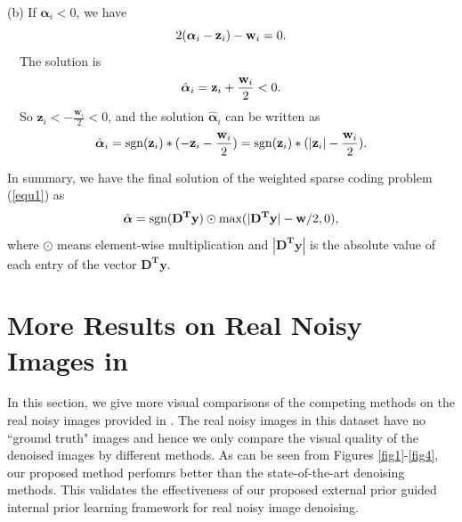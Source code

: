 \documentclass[10pt,onecolumn,letterpaper]{article}
\begin{document}
(b) If $\boldsymbol{\alpha}_{i}< 0$, we have
\begin{equation}\label{equ8}
\setlength{\abovedisplayskip}{0.1pt}
\setlength{\belowdisplayskip}{0.1pt}
2(\boldsymbol{\alpha}_{i}-\mathbf{z}_{i})-\mathbf{w}_{i}=0.
\end{equation}
\qquad\ \  The solution is
\begin{equation}\label{equ9}
\setlength{\abovedisplayskip}{0.1pt}
\setlength{\belowdisplayskip}{0.1pt}
\hat{\boldsymbol{\alpha}}_{i}=\mathbf{z}_{i}+\frac{\mathbf{w}_{i}}{2} < 0.
\end{equation}
\qquad\ \  So $\mathbf{z}_{i}<-\frac{\mathbf{w}_{i}}{2}< 0$, and the solution $\hat{\boldsymbol{\alpha}}_{i}$ can be written as
\begin{equation}\label{equ10}
\setlength{\abovedisplayskip}{1pt}
\setlength{\belowdisplayskip}{1pt}
\hat{\boldsymbol{\alpha}}_{i}=\text{sgn}(\mathbf{z}_{i})*(-\mathbf{z}_{i}-\frac{\mathbf{w}_{i}}{2})=\text{sgn}(\mathbf{z}_{i})*(|\mathbf{z}_{i}|-\frac{\mathbf{w}_{i}}{2}).
\end{equation} 

In summary, we have the final solution of the weighted sparse coding problem (\ref{equ1}) as
\begin{equation}\label{equ11}
\setlength{\abovedisplayskip}{3pt}
\setlength{\belowdisplayskip}{3pt}
\hat{\boldsymbol{\alpha}}= \text{sgn}(\mathbf{D^{T}y})\odot \text{max}(|\mathbf{D^{T}y}|-\mathbf{w}/2,0),
\end{equation}
where $\odot$ means element-wise multiplication and $|\mathbf{D^{T}y}|$ is the absolute value of each entry of the vector $\mathbf{D^{T}y}$.




\section{More Results on Real Noisy Images in \cite{ncwebsite}}
In this section, we give more visual comparisons of the competing methods on the real noisy images provided in \cite{ncwebsite}. The real noisy images in this dataset \cite{ncwebsite} have no ``ground truth" images and hence we only compare the visual quality of the denoised images by different methods. As can be seen from Figures \ref{fig1}-\ref{fig4}, our proposed method perfomrs better than the state-of-the-art denoising methods. This validates the effectiveness of our proposed external prior guided internal prior learning framework for real noisy image denoising.
\end{document}
